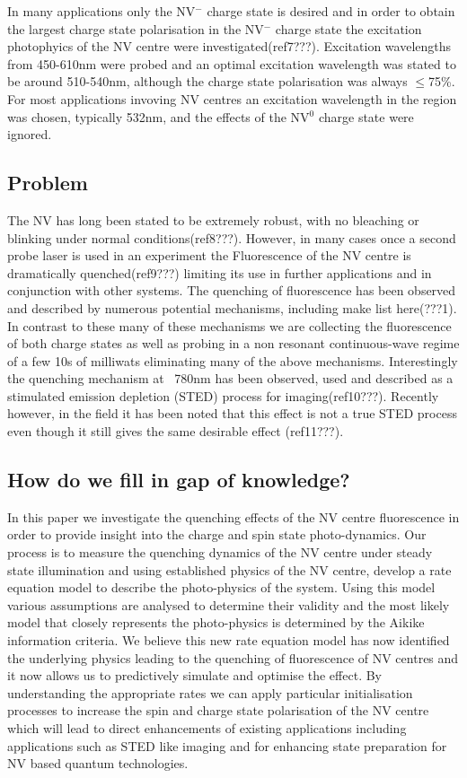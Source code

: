 \documentclass[prl]{revtex4}
\begin{document}
In many applications only the NV$^-$ charge state is desired and in order to obtain the largest charge state polarisation in the NV$^-$ charge state the excitation photophyics of the NV centre were investigated(ref7???). Excitation wavelengths from 450-610nm were probed and an optimal excitation wavelength was stated to be around 510-540nm, although the charge state polarisation was always $\leq$75\%. For most applications invoving NV centres an excitation wavelength in the region was chosen, typically 532nm, and the effects of the NV$^0$ charge state were ignored.

\subsection{Problem}

The NV has long been stated to be extremely robust, with no bleaching or blinking under normal conditions(ref8???). However, in many cases once a second probe laser is used in an experiment the Fluorescence of the NV centre is dramatically quenched(ref9???) limiting its use in further applications and in conjunction with other systems. The quenching of fluorescence has been observed and described by numerous potential mechanisms, including make list here(???1). In contrast to these many of these mechanisms we are collecting the fluorescence of both charge states as well as probing in a non resonant continuous-wave regime of a few 10s of milliwats eliminating many of the above mechanisms. Interestingly the quenching mechanism at ~780nm has been observed, used and described as a stimulated emission depletion (STED) process for imaging(ref10???). Recently however, in the field it has been noted that this effect is not a true STED process even though it still gives the same desirable effect (ref11???).  

\subsection{How do we fill in gap of knowledge?}

In this paper we investigate the quenching effects of the NV centre fluorescence in order to provide insight into the charge and spin state photo-dynamics. Our process is to measure the quenching dynamics of the NV centre under steady state illumination and using established physics of the NV centre, develop a rate equation model to describe the photo-physics of the system. Using this model various assumptions are analysed to determine their validity and the most likely model that closely represents the photo-physics is determined by the Aikike information criteria. We believe this new rate equation model has now identified the underlying physics leading to the quenching of fluorescence of NV centres and it now allows us to predictively simulate and optimise the effect. By understanding the appropriate rates we can apply particular initialisation processes to increase the spin and charge state polarisation of the NV centre which will lead to direct enhancements of existing applications including applications such as STED like imaging and for enhancing state preparation for NV based quantum technologies.
\end{document}
